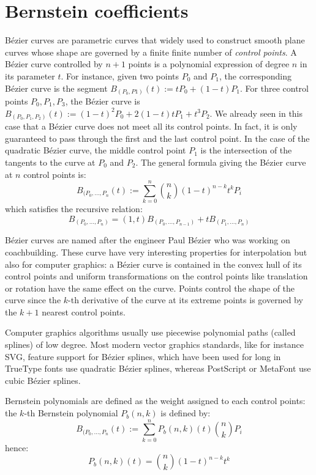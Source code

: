 \documentclass{mscs}
\begin{document}
\section{Bernstein coefficients}
\label{sec:bernsteindef}
B\'ezier curves \cite{bezier} are parametric curves that widely used
to construct
smooth plane curves whose shape are governed by a finite finite number
of \emph{control points}. A B\'ezier curve controlled by $n+1$ points is
a polynomial expression of degree $n$ in its parameter $t$. For
instance, given two points $P_0$ and $P_1$, the corresponding B\'ezier
curve is the segment $B_{(P_0, P1)}(t) := tP_0 + (1 - t)P_1$. For three control
points $P_0, P_1, P_3$, the B\'ezier curve is
$B_{(P_0, P_1, P_2)}(t) := (1 - t)^2P_0 + 2(1 - t)tP_1 + t^3P_2$.
We already seen in this case that a B\'ezier
curve does not meet all its control points. In fact, it is only
guaranteed to pass through the first and the last control point. In
the case of the quadratic B\'ezier curve, the middle control point $P_1$
is the intersection of the tangents to the curve at $P_0$ and
$P_2$. The general formula giving the B\'ezier curve at $n$ control
points is:
$$B_{(P_0, \dots,P_n}(t) := \sum_{k = 0}^n \binom{n}{k}(1 -t)^{n - k}t^k P_i$$
which satisfies the recursive relation:
$$B_{(P_0,\dots, P_n)} = (1, t)B_{(P_0, \dots, P_{n-1})} + tB_{(P_1, \dots, P_n)}$$

B\'ezier curves are named after the engineer Paul B\'ezier who was working
on coachbuilding. These curve have very interesting properties for
interpolation but also for computer graphics: a B\'ezier curve is
contained in the convex hull of its control
points and uniform transformations on the control points like
translation or rotation have the same effect on the curve. Points
control the shape of the curve since the $k$-th derivative of the
curve at its extreme points is governed by the $k+1$ nearest
control points.

Computer graphics algorithms usually use piecewise polynomial paths
(called splines) of  low degree. Most modern vector graphics
standards, like for instance SVG, feature support for B\'ezier splines,
which have been used for long in TrueType fonts use quadratic B\'ezier
splines, whereas PostScript or MetaFont \cite{metafont} use cubic
B\'ezier splines.


Bernstein polynomials are defined as the weight assigned to each
control points: the $k$-th Bernstein polynomial $P_b(n, k)$ is defined by:
$$B_{(P_0, \dots,P_n}(t) := \sum_{k = 0}^n P_b(n, k)(t)\binom{n}{k}P_i$$
hence:
$$P_b(n,  k)(t) = \binom{n}{k}(1 -t)^{n - k}t^k$$
\end{document}
